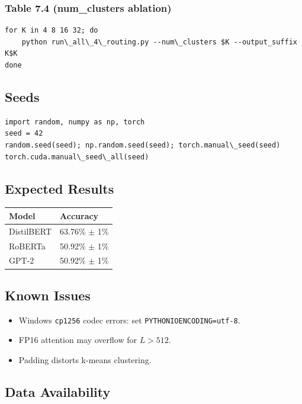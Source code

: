 \subsubsection{Table 7.4 (num\_clusters ablation)}

\begin{lstlisting}
for K in 4 8 16 32; do
    python run\_all\_4\_routing.py --num\_clusters $K --output_suffix K$K
done
\end{lstlisting}

\subsection{Seeds}

\begin{lstlisting}
import random, numpy as np, torch
seed = 42
random.seed(seed); np.random.seed(seed); torch.manual\_seed(seed)
torch.cuda.manual\_seed\_all(seed)
\end{lstlisting}

\subsection{Expected Results}

\begin{table}[H]
\centering
\small
\begin{tabular}{ll}
\toprule
\textbf{Model} & \textbf{Accuracy} \\
\midrule
DistilBERT & 63.76\% $\pm$ 1\% \\
RoBERTa & 50.92\% $\pm$ 1\% \\
GPT-2 & 50.92\% $\pm$ 1\% \\
\bottomrule
\end{tabular}
\end{table}

\subsection{Known Issues}

\begin{itemize}
\item Windows \texttt{cp1256} codec errors: set \texttt{PYTHONIOENCODING=utf-8}.
\item FP16 attention may overflow for $L > 512$.
\item Padding distorts k-means clustering.

\end{itemize}
\subsection{Data Availability}

